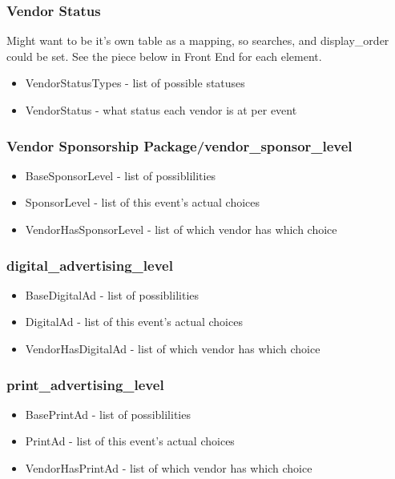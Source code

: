 \documentclass[captions=tablesignature]{scrartcl}
\begin{document}
\subsubsection{Vendor Status}
\label{sec-2-5-6}
Might want to be it's own table as a mapping, so searches, and
display\_order could be set.  See the piece below in Front End for
each element.
\begin{itemize}
\item VendorStatusTypes - list of possible statuses
\item VendorStatus - what status each vendor is at per event
\end{itemize}

\subsubsection{Vendor Sponsorship Package/vendor\_sponsor\_level}
\label{sec-2-5-7}
\begin{itemize}
\item BaseSponsorLevel - list of possiblilities
\item SponsorLevel - list of this event's actual choices
\item VendorHasSponsorLevel - list of which vendor has which choice
\end{itemize}

\subsubsection{digital\_advertising\_level}
\label{sec-2-5-8}
\begin{itemize}
\item BaseDigitalAd - list of possiblilities
\item DigitalAd - list of this event's actual choices
\item VendorHasDigitalAd - list of which vendor has which choice
\end{itemize}

\subsubsection{print\_advertising\_level}
\label{sec-2-5-9}
\begin{itemize}
\item BasePrintAd - list of possiblilities
\item PrintAd - list of this event's actual choices
\item VendorHasPrintAd - list of which vendor has which choice
\end{itemize}
\end{document}
